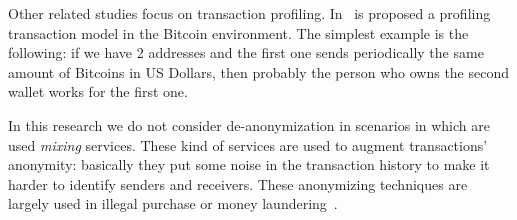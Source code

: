 Other related studies focus on transaction profiling.
In~\cite{bib:fullDiscl} is
proposed a profiling transaction model in the Bitcoin environment. The
simplest example is the following: if we have 2 addresses and the first one
sends periodically the same amount of Bitcoins in US Dollars, then probably
the person who owns the second wallet works for the first one.

In this research we do not consider de-anonymization in scenarios in which are
used \textit{mixing} services. These kind of services are used to augment
transactions' anonymity: basically they put some noise in the transaction
history to make it harder to identify senders and receivers.
These anonymizing techniques are largely used in illegal purchase or money
laundering~\cite{bib:laundering}.
